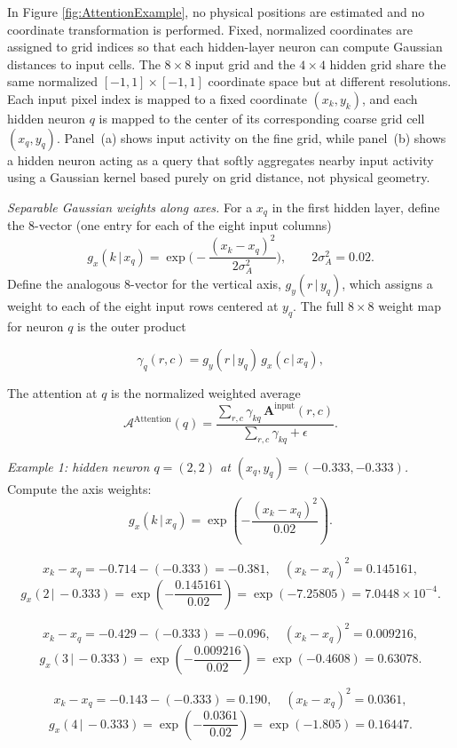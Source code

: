 In Figure \ref{fig:AttentionExample}, no physical positions are estimated and no coordinate transformation is performed. 
Fixed, normalized coordinates are assigned to grid indices so that each hidden-layer neuron can compute Gaussian distances to input cells. 
The $8\times8$ input grid and the $4\times4$ hidden grid share the same normalized $[-1,1]\times[-1,1]$ coordinate space but at different resolutions. 
Each input pixel index is mapped to a fixed coordinate $(x_k,y_k)$, and each hidden neuron $q$ is mapped to the center of its corresponding coarse grid cell $(x_q,y_q)$. 
Panel~(a) shows input activity on the fine grid, while panel~(b) shows a hidden neuron acting as a query that softly aggregates nearby input activity using a Gaussian kernel based purely on grid distance, not physical geometry.

\emph{Separable Gaussian weights along axes.}
For a $x_q$ in the first hidden layer, define the $8$-vector (one entry for each of the eight input columns)
\[
g_x(k\,|\,x_q)=\exp\!\Big(-\frac{(x_k-x_q)^2}{2\sigma_A^2}\Big),\qquad
2\sigma_A^2=0.02.
\]
Define the analogous 8-vector for the vertical axis, $g_y(r\,|\,y_q)$, which assigns a weight to each of the eight input rows centered at $y_q$. The full $8\times 8$ weight map for neuron $q$ is the outer product

\[
\gamma_{q}(r,c)=g_y(r\,|\,y_q)\,g_x(c\,|\,x_q),
\]

\noindent The attention at $q$ is the normalized weighted average
\[
\mathcal{A}^{\text{Attention}}(q)=\frac{\sum_{r,c} \gamma_{kq}\,\mathbf{A}^{\text{input}}(r,c)}{\sum_{r,c} \gamma_{kq}+\epsilon}.
\]

\emph{Example 1: hidden neuron $q=(2,2)$ at $(x_q,y_q)=(-0.333,-0.333)$.}
Compute the axis weights:
\[
g_x(k\,|\,x_q)=\exp\!\left(-\frac{(x_k-x_q)^2}{0.02}\right).
\]

\[
x_k-x_q=-0.714-(-0.333)=-0.381,\quad (x_k-x_q)^2=0.145161,
\]
\[
g_x(2\,|\,-0.333)=\exp\!\left(-\frac{0.145161}{0.02}\right)=\exp(-7.25805)= 7.0448\times 10^{-4}.
\]

\[
x_k-x_q=-0.429-(-0.333)=-0.096,\quad (x_k-x_q)^2=0.009216,
\]
\[
g_x(3\,|\,-0.333)=\exp\!\left(-\frac{0.009216}{0.02}\right)=\exp(-0.4608)= 0.63078.
\]

\[
x_k-x_q=-0.143-(-0.333)=0.190,\quad (x_k-x_q)^2=0.0361,
\]
\[
g_x(4\,|\,-0.333)=\exp\!\left(-\frac{0.0361}{0.02}\right)=\exp(-1.805)= 0.16447.
\]

